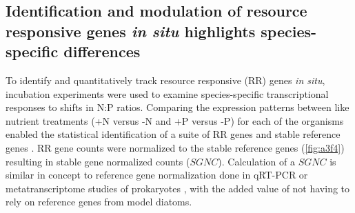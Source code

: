 \subsection{Identification and modulation of resource responsive genes \textit{in situ} highlights species-specific differences}
To identify and quantitatively track resource responsive (RR) genes \textit{in situ}, incubation experiments were used to examine species-specific transcriptional responses to shifts in N:P ratios. Comparing the expression patterns between like nutrient treatments (+N versus -N and +P versus -P) for each of the organisms enabled the statistical identification of a suite of RR genes \citep{Wu2010} and stable reference genes \citep{Alexander2012}. RR gene counts were normalized to the stable reference genes (\cref{fig:a3f4}) resulting in stable gene normalized counts ($SGNC$). Calculation of a $SGNC$ is similar in concept to reference gene normalization done in qRT-PCR \citep{Bustin2000} or metatranscriptome studies of prokaryotes \citep{McCarren2010}, with the added value of not having to rely on reference genes from model diatoms.\par
